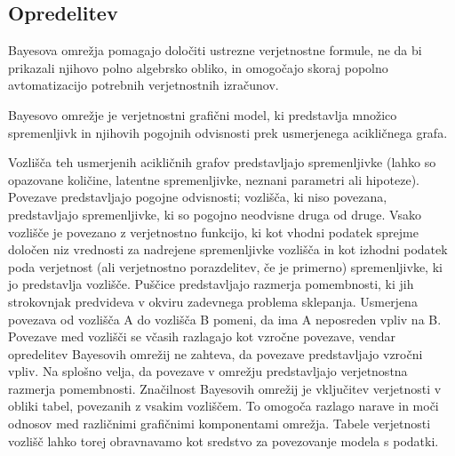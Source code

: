 \documentclass[mat1, tisk]{fmfdelo}
\theoremstyle{definition} %
\theoremstyle{trditev} %
\theoremstyle{izrek}
\begin{document}
\subsection{Opredelitev}
Bayesova omrežja pomagajo določiti ustrezne verjetnostne formule, ne da bi prikazali njihovo polno algebrsko obliko, in omogočajo
skoraj popolno avtomatizacijo potrebnih verjetnostnih izračunov.
\begin{definicija}
   Bayesovo omrežje je verjetnostni grafični model, ki predstavlja množico spremenljivk in njihovih pogojnih odvisnosti prek usmerjenega
   acikličnega grafa.
\end{definicija}
Vozlišča teh usmerjenih acikličnih grafov predstavljajo spremenljivke (lahko so opazovane količine, latentne spremenljivke, neznani parametri
ali hipoteze). Povezave predstavljajo pogojne odvisnosti; vozlišča, ki niso povezana, predstavljajo spremenljivke, ki so pogojno neodvisne
druga od druge. Vsako vozlišče je povezano z verjetnostno funkcijo, ki kot vhodni podatek sprejme določen niz vrednosti za nadrejene spremenljivke
vozlišča in kot izhodni podatek poda verjetnost (ali verjetnostno porazdelitev, če je primerno) spremenljivke, ki jo predstavlja vozlišče. Puščice
predstavljajo razmerja pomembnosti, ki jih strokovnjak predvideva v okviru zadevnega problema sklepanja. Usmerjena povezava od vozlišča A do
vozlišča B pomeni, da ima A neposreden vpliv na B. Povezave med vozlišči se včasih razlagajo kot vzročne povezave, vendar opredelitev Bayesovih
omrežij ne zahteva, da povezave predstavljajo vzročni vpliv. Na splošno velja, da povezave v omrežju predstavljajo verjetnostna razmerja
pomembnosti. Značilnost Bayesovih omrežij je vključitev verjetnosti v obliki tabel, povezanih z vsakim vozliščem. To omogoča razlago narave in
moči odnosov med različnimi grafičnimi komponentami omrežja. Tabele verjetnosti vozlišč lahko torej obravnavamo kot sredstvo za povezovanje
modela s podatki.

\end{document}

